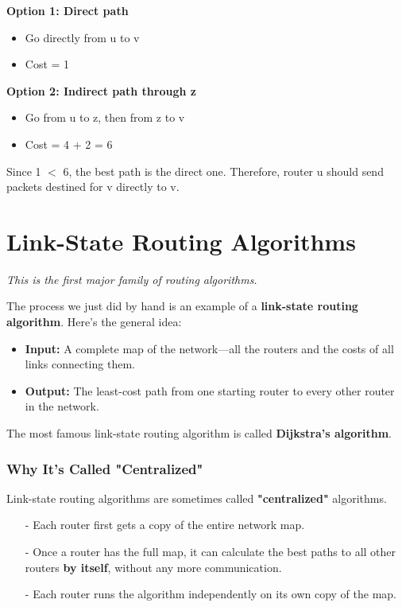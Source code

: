 \documentclass[../../compsys.tex]{subfiles}
\begin{document}
\textbf{Option 1: Direct path}
\begin{itemize}
    \item Go directly from u to v
    \item Cost = 1
\end{itemize}

\textbf{Option 2: Indirect path through z}
\begin{itemize}
    \item Go from u to z, then from z to v
    \item Cost = 4 + 2 = 6
\end{itemize}

Since 1 $<$ 6, the best path is the direct one.
Therefore, router u should send packets destined for v directly to v.

\section{Link-State Routing Algorithms}
\textit{This is the first major family of routing algorithms.}

The process we just did by hand is an example of a \textbf{link-state routing algorithm}. Here's the general idea:
\begin{itemize}
    \item \textbf{Input:} A complete map of the network—all the routers and the costs of all links connecting them.
    \item \textbf{Output:} The least-cost path from one starting router to every other router in the network.
\end{itemize}

The most famous link-state routing algorithm is called \textbf{Dijkstra's algorithm}.

\subsubsection{Why It's Called "Centralized"}
Link-state routing algorithms are sometimes called \textbf{"centralized"} algorithms.
\begin{itemize}
    \item[-] Each router first gets a copy of the entire network map.
    \item[-] Once a router has the full map, it can calculate the best paths to all other routers \textbf{by itself}, without any more communication.
    \item[-] Each router runs the algorithm independently on its own copy of the map.
\end{itemize}
\end{document}
